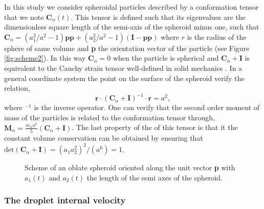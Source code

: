 In this study we consider spheroidal particles described by a conformation tensor that we note $\textbf{C}_\alpha(t)$.  
This tensor is defined such that its eigenvalues are the dimensionless square length of the semi-axis of the spheroid minus one, such that $\textbf{C}_\alpha = (a_1^2/a^2 - 1) \textbf{pp} + (a_2^2 /a^2 - 1) (\textbf{I}-\textbf{pp})$ where $r$ is the radius of the sphere of same volume and \textbf{p} the orientation vector of the particle (see Figure \ref{fig:scheme2}).  
In this way $\textbf{C}_\alpha = 0$ when the particle is spherical and  $\textbf{C}_\alpha + \textbf{I}$ is equivalent to the Cauchy strain tensor well-defined in solid mechanics \citet{mwasame2017macroscopic}. 
In a general coordinate system the point on the surface of the spheroid verify the relation, 
\begin{equation*}
    \textbf{r}\cdot(\textbf{C}_\alpha + \textbf{I})^{-1}\cdot\textbf{r} = a^2,
\end{equation*}
where $^{-1}$ is the inverse operator.  
One can verify that the second order moment of mass of the particles is related to the conformation tensor through, $\textbf{M}_\alpha = \frac{m_\alpha  a^2}{5} (\textbf{C}_\alpha + \textbf{I})$. 
The last property of the of this tensor is that it the constant volume conservation can be obtained by ensuring that $\text{det}(\textbf{C}_\alpha +\textbf{I}) = (a_1a_2^2)^2 /(a^6) = 1$. 
\begin{figure}[h!]
    \centering
    \hfill
    \hfill
    \caption{Scheme of an  oblate spheroid oriented along the unit vector \textbf{p} with $a_1(t)$ and $a_2(t)$ the length of the semi axes of the spheroid.}
\end{figure}


\subsubsection*{The droplet internal velocity}

